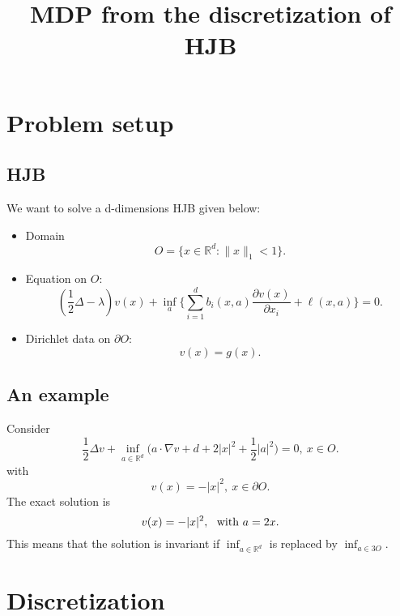 \documentclass[11pt]{amsart}
\title{MDP from the discretization of HJB}
\begin{document}
\maketitle

\section{Problem setup}
\subsection{HJB}
We want to solve a d-dimensions HJB given below:
\begin{itemize}
 \item Domain 
 $$O = \{x\in \mathbb R^{d}: \|x\|_{1} < 1\}.$$
 \item Equation on $O$: 
 $$(\frac 1 2 \Delta -  \lambda) v(x) + \inf_a \Big\{
 \sum_{i=1}^db_i(x,a)  \frac{\partial v(x)}{\partial x_i}  
  + \ell(x,a)
 \Big\} = 0.$$
 \item Dirichlet data on $\partial O$:
 $$v(x) = g(x).$$
\end{itemize}

\subsection{An example} Consider
$$
 \frac 1 2 \Delta v + \inf_{a\in \mathbb R^{d}}
 \Big(a \cdot \nabla v +d + 2|x|^2 + \frac 1 2 |a| ^2 \Big) = 0, \ x\in O.
$$
with
$$
v(x) = -|x|^2, \ x\in \partial O.
$$
The exact solution is 
$$
v(x) =  -|x|^2, \ \hbox{ with } a= 2x.
$$
This means that the solution is invariant if $\inf_{a\in \mathbb R^{d}}$ is
replaced by $\inf_{a\in 3 O}$.
\section{Discretization}
\end{document}
